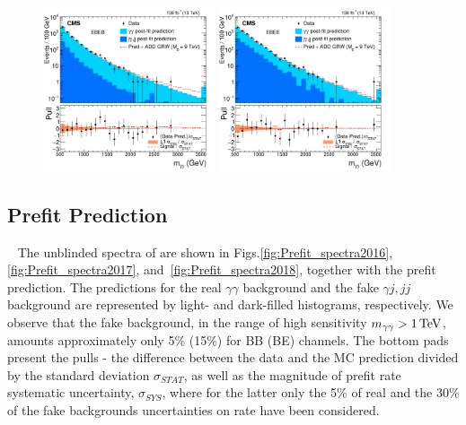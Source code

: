 \begin{figure}[!htbp]{
}
\includegraphics[width=0.45\textwidth]{fig/Figure_006-a-1.png}
\includegraphics[width=0.45\textwidth]{fig/Figure_006-b-1.png}
\end{figure}


\subsection{Prefit Prediction}~\label{sec:Prefit}
The unblinded spectra of \mgg are shown in Figs.\ref{fig:Prefit_spectra2016},\ref{fig:Prefit_spectra2017}, and~\ref{fig:Prefit_spectra2018}, together with the prefit prediction. The predictions for the real $\gamma\gamma$ background and the fake $\gamma j, jj$ background are represented by light- and dark-filled histograms, respectively. We observe that the fake background, in the range of high sensitivity $m_{\gamma\gamma}>1\,\text{Te\hspace{-.08em}V}$, amounts approximately only 5\% (15\%) for BB (BE) channels. 
The bottom pads present the pulls - the difference between the data and the MC prediction divided by the standard deviation $\sigma_{STAT}$, as well as the magnitude of prefit rate systematic uncertainty, $\sigma_{SYS}$, where for the latter only the 5\% of real and the 30\% of the fake backgrounds uncertainties on rate have been considered.

